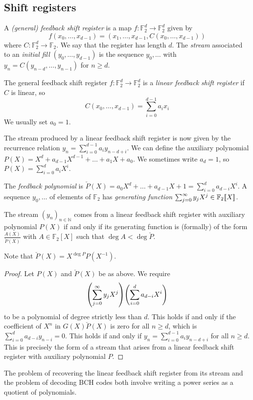 \subsection{Shift registers}
\begin{definition}
    A \emph{(general) feedback shift register} is a map \( f \colon \mathbb F_2^d \to \mathbb F_2^d \) given by
    \[ f(x_0, \dots, x_{d-1}) = (x_1, \dots, x_{d-1}, C(x_0, \dots, x_{d-1})) \]
    where \( C \colon \mathbb F_2^d \to \mathbb F_2 \).
    We say that the register has length \( d \).
    The \emph{stream} associated to an \emph{initial fill} \( (y_0, \dots, y_{d-1}) \) is the sequence \( y_0, \dots \) with \( y_n = C(y_{n-d}, \dots, y_{n-1}) \) for \( n \geq d \).
\end{definition}
\begin{definition}
    The general feedback shift register \( f \colon \mathbb F_2^d \to \mathbb F_2^d \) is a \emph{linear feedback shift register} if \( C \) is linear, so
    \[ C(x_0, \dots, x_{d-1}) = \sum_{i=0}^{d-1} a_i x_i \]
    We usually set \( a_0 = 1 \).
\end{definition}
The stream produced by a linear feedback shift register is now given by the recurrence relation \( y_n = \sum_{i=0}^{d-1} a_i y_{n-d+i} \).
We can define the auxiliary polynomial \( P(X) = X^d + a_{d-1} X^{d-1} + \dots + a_1 X + a_0 \).
We sometimes write \( a_d = 1 \), so \( P(X) = \sum_{i=0}^d a_i X^i \).
\begin{definition}
    The \emph{feedback polynomial} is \( \check{P}(X) = a_0 X^d + \dots + a_{d-1} X + 1 = \sum_{i=0}^d a_{d-i} X^i \).
    A sequence \( y_0, \dots \) of elements of \( \mathbb F_2 \) has \emph{generating function} \( \sum_{j=0}^\infty y_j X^j \in \mathbb F_2[\![X]\!] \).
\end{definition}
\begin{theorem}
    The stream \( (y_n)_{n \in \mathbb N} \) comes from a linear feedback shift register with auxiliary polynomial \( P(X) \) if and only if its generating function is (formally) of the form \( \frac{A(X)}{\check{P}(X)} \) with \( A \in \mathbb F_2[X] \) such that \( \deg A < \deg \check{P} \).
\end{theorem}
Note that \( \check{P}(X) = X^{\deg P}P(X^{-1}) \).
\begin{proof}
    Let \( P(X) \) and \( \check{P}(X) \) be as above.
    We require
    \[ \qty(\sum_{j=0}^\infty y_j X^j) \qty(\sum_{i=0}^d a_{d-i} X^i) \]
    to be a polynomial of degree strictly less than \( d \).
    This holds if and only if the coefficient of \( X^n \) in \( G(X) \check{P}(X) \) is zero for all \( n \geq d \), which is \( \sum_{i=0}^d a_{d-i} y_{n-i} = 0 \).
    This holds if and only if \( y_n = \sum_{i=0}^{d-1} a_i y_{n-d + i} \) for all \( n \geq d \).
    This is precisely the form of a stream that arises from a linear feedback shift register with auxiliary polynomial \( P \).
\end{proof}
The problem of recovering the linear feedback shift register from its stream and the problem of decoding BCH codes both involve writing a power series as a quotient of polynomials.

